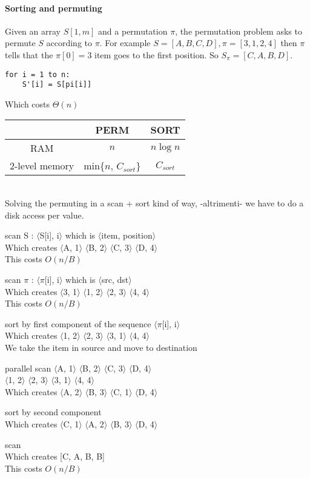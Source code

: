 \documentclass[10pt]{report}
\begin{document}
\paragraph{Sorting and permuting} Given an array $S[1, m]$ and a permutation $\pi$, the permutation problem asks to permute $S$ according to $\pi$. For example $S = [A, B, C, D], \pi = [3, 1, 2, 4]$ then $\pi$ tells that the $\pi[0] = 3$ item goes to the first position. So $S_\pi = [C, A, B, D]$.
\begin{lstlisting}
for i = 1 to n:
	S'[i] = S[pi[i]]
\end{lstlisting}
Which costs $\Theta(n)$\\
\begin{tabular}{c | c | c}
 & PERM & SORT \\
\hline
RAM & $n$ & $n\log n$\\
\hline
2-level memory & min\{$n$, $C_{sort}$\} & $C_{sort}$
\end{tabular}\\
Solving the permuting in a scan + sort kind of way, -altrimenti- we have to do a disk access per value.\\
\begin{list}{}{}
	\item scan S : $\langle$S[i], i$\rangle$ which is $\langle$item, position$\rangle$\\
	Which creates $\langle$A, 1$\rangle$ $\langle$B, 2$\rangle$ $\langle$C, 3$\rangle$ $\langle$D, 4$\rangle$\\
	This costs $O(n/B)$
	\item scan $\pi$ : $\langle\pi$[i], i$\rangle$ which is $\langle$src, dst$\rangle$\\
	Which creates $\langle$3, 1$\rangle$ $\langle$1, 2$\rangle$ $\langle$2, 3$\rangle$ $\langle$4, 4$\rangle$\\
	This costs $O(n/B)$
	\item sort by first component of the sequence $\langle\pi$[i], i$\rangle$\\
	Which creates $\langle$1, 2$\rangle$ $\langle$2, 3$\rangle$ $\langle$3, 1$\rangle$ $\langle$4, 4$\rangle$\\
	We take the item in source and move to destination
	\item parallel scan
	$\langle$A, 1$\rangle$ $\langle$B, 2$\rangle$ $\langle$C, 3$\rangle$ $\langle$D, 4$\rangle$\\
	$\langle$1, 2$\rangle$ $\langle$2, 3$\rangle$ $\langle$3, 1$\rangle$ $\langle$4, 4$\rangle$\\
	Which creates $\langle$A, 2$\rangle$ $\langle$B, 3$\rangle$ $\langle$C, 1$\rangle$ $\langle$D, 4$\rangle$\\
	\item sort by second component\\
	Which creates $\langle$C, 1$\rangle$ $\langle$A, 2$\rangle$ $\langle$B, 3$\rangle$ $\langle$D, 4$\rangle$\\
	\item scan\\
	Which creates [C, A, B, B]\\
	This costs $O(n/B)$
\end{list}
\end{document}
